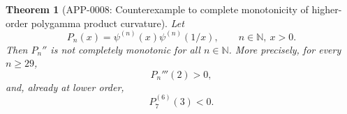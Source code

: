 \documentclass[11pt]{article}
\numberwithin{equation}{section}
\newtheorem{theorem}{Theorem}[section]
\theoremstyle{definition}
\theoremstyle{remark}
\newcommand{\N}{\mathbb N}
\newcommand{\1}{\mathbf 1}
\begin{document}
\begin{theorem}[APP-0008: Counterexample to complete monotonicity of higher-order polygamma product curvature]
\label{thm:pn-complete-monotonicity-counterexample}
Let
\begin{equation}
\label{eq:pn-product}
P_n(x)=\psi^{(n)}(x)\psi^{(n)}(1/x),\qquad n\in\N,\ x>0.
\end{equation}
Then \(P_n''\) is not completely monotonic for all \(n\in\N\).  More precisely, for every \(n\ge29\),
\begin{equation}
\label{eq:pn-high-order-third-positive}
P_n'''(2)>0,
\end{equation}
and, already at lower order,
\begin{equation}
\label{eq:p7-sixth-negative}
P_7^{(6)}(3)<0.
\end{equation}
\end{theorem}
\end{document}
